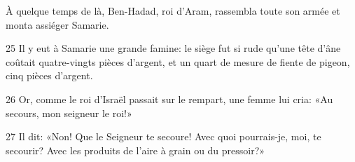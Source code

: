 À quelque temps de là, Ben-Hadad, roi d’Aram, rassembla toute son armée et monta assiéger Samarie.

25 Il y eut à Samarie une grande famine: le siège fut si rude qu’une tête d’âne coûtait quatre-vingts pièces d’argent, et un quart de mesure de fiente de pigeon, cinq pièces d’argent.

26 Or, comme le roi d’Israël passait sur le rempart, une femme lui cria: «Au secours, mon seigneur le roi!»

27 Il dit: «Non! Que le Seigneur te secoure! Avec quoi pourrais-je, moi, te secourir? Avec les produits de l’aire à grain ou du pressoir?»
